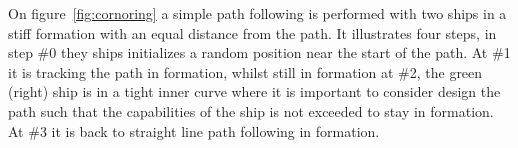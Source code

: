 On figure~\vref{fig:cornoring} a simple path following is performed
with two ships in a stiff formation with an equal distance from the
path. It illustrates four steps, in step \#0 they ships initializes a
random position near the start of the path. At \#1 it is tracking the
path in formation, whilst still in formation at \#2, the green
(right) ship is in a tight inner curve where it is important to
consider design the path such that the capabilities of the ship is not
exceeded to stay in formation. At \#3 it is back to straight line path
following in formation.

